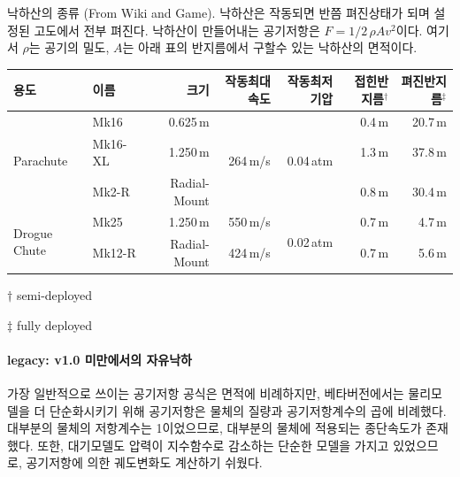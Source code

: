 \documentclass[9pt]{amsbook}
\begin{document}
\begin{center}
\begin{adjustbox}{width=\textwidth}
\begin{threeparttable}
\caption{
낙하산의 종류
(From Wiki and Game). 
낙하산은 작동되면 반쯤 펴진상태가 되며 설정된 고도에서 전부 펴진다. 
낙하산이 만들어내는 공기저항은 $F = 1/2 \,\rho A v^2$이다. 
여기서 $\rho$는 공기의 밀도, $A$는 아래 표의 반지름에서 구할수 있는 낙하산의 면적이다.}
\label{table:parachute}
\begin{tabular}{|l|l|r|r|r|r|r|}
\hline
용도&이름&크기&작동최대속도&작동최저기압&접힌반지름$^\dagger$&펴진반지름$^\ddagger$
\\\hline
\multirow{3}{*}{Parachute}&Mk16&0.625\,m&\multirow{3}{*}{264\,m/s}&\multirow{3}{*}{0.04\,atm}
&0.4\,m&20.7\,m
\\
&Mk16-XL&1.250\,m&&&1.3\,m&37.8\,m
\\
&Mk2-R &Radial-Mount&&&0.8\,m&30.4\,m
\\\hline
\multirow{2}{*}{Drogue Chute}&Mk25&1.250\,m&550\,m/s&\multirow{2}{*}{0.02\,atm}&0.7\,m&4.7\,m
\\
&Mk12-R &Radial-Mount&424\,m/s&&0.7\,m&5.6\,m
\\\hline
\end{tabular}
\begin{tablenotes}
\item[$\dagger$] semi-deployed
\item[$\ddagger$] fully deployed
\end{tablenotes}
\end{threeparttable}
\end{adjustbox}
\end{center}


\paragraph{legacy: v1.0 미만에서의 자유낙하}
가장 일반적으로 쓰이는 공기저항 공식은 면적에 비례하지만, 
베타버전에서는 물리모델을 더 단순화시키기 위해 공기저항은 물체의 질량과 공기저항계수의 곱에 비례했다.
대부분의 물체의 저항계수는 1이었으므로,
대부분의 물체에 적용되는 종단속도가 존재했다.
또한, 대기모델도 압력이 지수함수로 감소하는 단순한 모델을 가지고 있었으므로,
공기저항에 의한 궤도변화도 계산하기 쉬웠다.
\end{document}
